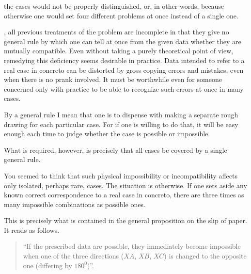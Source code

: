 \begin{center}\hspace{.8cm}\end{center}

the cases would not be properly distinguished, or, in other words, because otherwise one would set four different problems at once instead of a single one.

, all previous treatments of the problem are incomplete in that they give no general rule by which one can tell at once from the given data whether they are mutually compatible. Even without taking a purely theoretical point of view, remedying this deficiency seems desirable in practice. Data intended to refer to a real case in concreto can be distorted by gross copying errors and mistakes, even when there is no prank involved. It must be worthwhile even for someone concerned only with practice to be able to recognize such errors at once in many cases.

By a general rule I mean that one is to dispense with making a separate rough drawing for each particular case. For if one is willing to do that, it will be easy enough each time to judge whether the case is possible or impossible.

What is required, however, is precisely that all cases be covered by a single general rule.

You seemed to think that such physical impossibility or incompatibility affects only isolated, perhaps rare, cases. The situation is otherwise. If one sets aside any known correct correspondence to a real case in concreto, there are three times as many impossible combinations as possible ones.

This is precisely what is contained in the general proposition on the slip of paper. It reads as follows.

\begin{quote}“If the prescribed data are possible, they immediately become impossible when one of the three directions ($XA$, $XB$, $XC$) is changed to the opposite one (differing by $180^0$)”.\end{quote}
